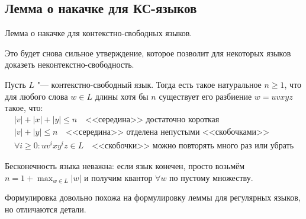 
\subsection{Лемма о накачке для КС-языков}
Лемма о накачке для контекстно-свободных языков.

Это будет снова сильное утверждение, которое позволит для некоторых языков
доказеть неконтекстно-свободность.

\begin{lemma}
    Пусть $L$ "--- контекстно-свободный язык.
    Тогда есть такое натуральное $n\ge 1$, что для любого слова $w \in L$ длины хотя бы $n$
    существует его разбиение $w=uvxyz$ такое, что:
    \begin{gather*}
        |v| + |x| + |y| \le n \quad \text{<<середина>> достаточно короткая}\\
        |v| + |y| \le n \quad \text{<<середина>> отделена непустыми <<скобочками>>}\\
        \forall i \ge 0 \colon uv^ixy^iz \in L \quad \text{<<скобочки>> можно повторять много раз или убрать}
    \end{gather*}
\end{lemma}
\begin{Rem}
    Бесконечность языка неважна: если язык конечен, просто возьмём $n=1+\max_{w\in L} |w|$
    и получим квантор $\forall w$ по пустому множеству.
\end{Rem}
\begin{Rem}
    Формулировка довольно похожа на формулировку леммы для регулярных языков, но отличаются детали.
\end{Rem}
